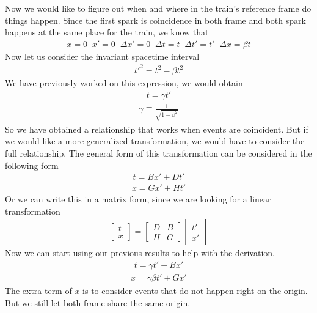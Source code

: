 \documentclass[11pt,letterpaper]{book}
\begin{document}
Now we would like to figure out when and where in the train's reference frame do things happen. Since the first spark is coincidence in both frame and both spark happens at the same place for the train, we know that
\begin{align}
x=0 \;\; x'=0 \;\; \Delta x' = 0 \;\; \Delta t = t \;\; \Delta t' = t' \;\; \Delta x = \beta t
\end{align}
Now let us consider the invariant spacetime interval
\begin{align}
t'^2=t^2-\beta t^2
\end{align}
We have previously worked on this expression, we would obtain
\begin{align}
t=\gamma t'
\end{align}
\begin{align}
\gamma \equiv \frac{1}{\sqrt{1-\beta ^2}}
\end{align}
So we have obtained a relationship that works when events are coincident. But if we would like a more generalized transformation, we would have to consider the full relationship. The general form of this transformation can be considered in the following form
\begin{align}
t=Bx'+Dt'
\end{align}
\begin{align}
x=Gx'+Ht'
\end{align}
Or we can write this in a matrix form, since we are looking for a linear transformation
\begin{align}
\begin{bmatrix}
    t \\ x
\end{bmatrix}
=
\begin{bmatrix}
    D&B\\
    H&G
\end{bmatrix}
\begin{bmatrix}
    t'\\ x'
\end{bmatrix}
\end{align}
Now we can start using our previous results to help with the derivation. 
\begin{align}
t = \gamma t' + Bx'
\end{align}
\begin{align}
x=\gamma \beta t' + Gx' 
\end{align}
The extra term of $x$ is to consider events that do not happen right on the origin. But we still let both frame share the same origin.\\
\end{document}
